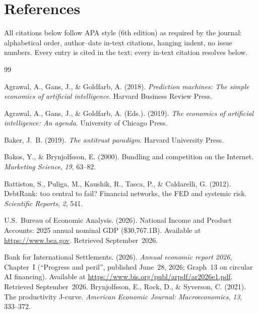 \documentclass[11pt,a4paper]{article}
\begin{document}
\renewcommand{\refname}{}
\section*{References}
\label{sec:references}
All citations below follow APA style (6th edition) as required by the journal: alphabetical order, author--date in-text citations, hanging indent, no issue numbers. Every entry is cited in the text; every in-text citation resolves below.

\begin{thebibliography}{99}

Agrawal, A., Gans, J., \& Goldfarb, A. (2018).
\emph{Prediction machines: The simple economics of artificial intelligence}.
Harvard Business Review Press.

Agrawal, A., Gans, J., \& Goldfarb, A. (Eds.). (2019).
\emph{The economics of artificial intelligence: An agenda}.
University of Chicago Press.

Baker, J.~B. (2019).
\emph{The antitrust paradigm}.
Harvard University Press.

Bakos, Y., \& Brynjolfsson, E. (2000).
Bundling and competition on the Internet.
\emph{Marketing Science}, \emph{19}, 63--82.

Battiston, S., Puliga, M., Kaushik, R., Tasca, P., \& Caldarelli, G. (2012).
DebtRank: too central to fail? Financial networks, the FED and systemic risk.
\emph{Scientific Reports}, \emph{2}, 541.

U.S.~Bureau of Economic Analysis. (2026).
National Income and Product Accounts: 2025 annual nominal GDP (\$30,767.1B).
Available at \url{https://www.bea.gov}.
Retrieved September~2026.

Bank for International Settlements. (2026).
\emph{Annual economic report 2026}, Chapter~I (``Progress and peril'',
published June~28, 2026; Graph~13 on circular AI financing).
Available at \url{https://www.bis.org/publ/arpdf/ar2026e1.pdf}.
Retrieved September~2026.
Brynjolfsson, E., Rock, D., \& Syverson, C. (2021).
The productivity J-curve.
\emph{American Economic Journal: Macroeconomics}, \emph{13}, 333--372.


\end{thebibliography}
\end{document}
